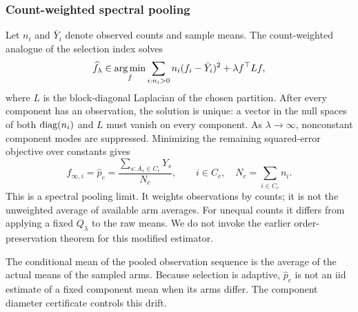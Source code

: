 \subsubsection{Count-weighted spectral pooling}
Let $n_i$ and $\bar Y_i$ denote observed counts and sample means. The count-weighted analogue of the selection index solves
\begin{equation}
 \widehat f_\lambda\in\operatorname*{arg\,min}_f
       \sum_{i:n_i>0}n_i(f_i-\bar Y_i)^2+\lambda f^\top Lf,
 \label{alignment_paper:eq:weighted}
\end{equation}
where $L$ is the block-diagonal Laplacian of the chosen partition. After every component has an observation, the solution is unique: a vector in the null spaces of both $\operatorname{diag}(n_i)$ and $L$ must vanish on every component. As $\lambda\to\infty$, nonconstant component modes are suppressed. Minimizing the remaining squared-error objective over constants gives
\begin{equation}
 \widehat f_{\infty,i}=\widehat p_c
 =\frac{\sum_{s:A_s\in C_c}Y_s}{N_c},\qquad i\in C_c,
 \quad N_c=\sum_{i\in C_c}n_i.
 \label{alignment_paper:eq:pool}
\end{equation}
This is a spectral pooling limit. It weights observations by counts; it is not the unweighted average of available arm averages. For unequal counts it differs from applying a fixed $Q_\lambda$ to the raw means. We do not invoke the earlier order-preservation theorem for this modified estimator.

The conditional mean of the pooled observation sequence is the average of the actual means of the sampled arms. Because selection is adaptive, $\widehat p_c$ is not an iid estimate of a fixed component mean when its arms differ. The component diameter certificate controls this drift.

